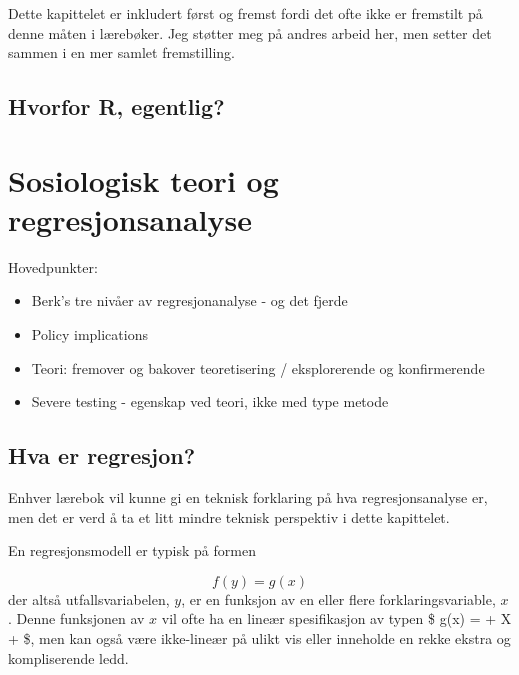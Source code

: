 \documentclass[
  letterpaper,
  DIV=11,
  numbers=noendperiod]{scrreprt}
\providecommand{\tightlist}{%
  \setlength{\itemsep}{0pt}\setlength{\parskip}{0pt}}\usepackage{longtable,booktabs,array}
\begin{document}
Dette kapittelet er inkludert først og fremst fordi det ofte ikke er
fremstilt på denne måten i lærebøker. Jeg støtter meg på andres arbeid
her, men setter det sammen i en mer samlet fremstilling.

\hypertarget{hvorfor-r-egentlig}{%
\section*{Hvorfor R, egentlig?}\label{hvorfor-r-egentlig}}



\hypertarget{sosiologisk-teori-og-regresjonsanalyse}{%
\chapter{Sosiologisk teori og
regresjonsanalyse}\label{sosiologisk-teori-og-regresjonsanalyse}}

Hovedpunkter:

\begin{itemize}
\tightlist
\item
  Berk's tre nivåer av regresjonanalyse - og det fjerde
\item
  Policy implications
\item
  Teori: fremover og bakover teoretisering / eksplorerende og
  konfirmerende
\item
  Severe testing - egenskap ved teori, ikke med type metode
\end{itemize}

\hypertarget{hva-er-regresjon}{%
\section{Hva er regresjon?}\label{hva-er-regresjon}}

Enhver lærebok vil kunne gi en teknisk forklaring på hva
regresjonsanalyse er, men det er verd å ta et litt mindre teknisk
perspektiv i dette kapittelet.

En regresjonsmodell er typisk på formen

\[ f(y) = g(x) \] der altså utfallsvariabelen, \(y\), er en funksjon av
en eller flere forklaringsvariable, \(x\). Denne funksjonen av \(x\) vil
ofte ha en lineær spesifikasjon av typen \$ g(x) = \alpha + \beta X +
\epsilon\$, men kan også være ikke-lineær på ulikt vis eller inneholde
en rekke ekstra og kompliserende ledd.
\end{document}

